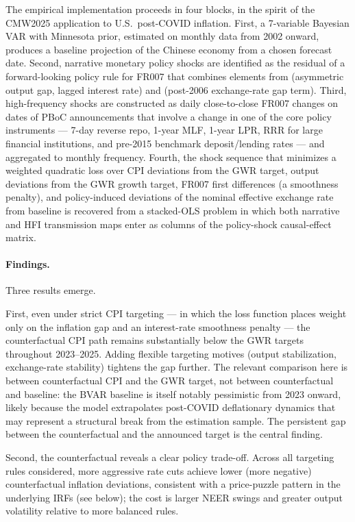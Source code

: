 \documentclass[12pt, a4paper]{article}
\begin{document}
The empirical implementation proceeds in four blocks, in the spirit of the CMW2025 application to U.S.\ post-COVID inflation. First, a 7-variable Bayesian VAR with Minnesota prior, estimated on monthly data from 2002 onward, produces a baseline projection of the Chinese economy from a chosen forecast date. Second, narrative monetary policy shocks are identified as the residual of a forward-looking policy rule for FR007 that combines elements from \citet{chen2025} (asymmetric output gap, lagged interest rate) and \citet{rey2026} (post-2006 exchange-rate gap term). Third, high-frequency shocks are constructed as daily close-to-close FR007 changes on dates of PBoC announcements that involve a change in one of the core policy instruments --- 7-day reverse repo, 1-year MLF, 1-year LPR, RRR for large financial institutions, and pre-2015 benchmark deposit/lending rates --- and aggregated to monthly frequency. Fourth, the shock sequence that minimizes a weighted quadratic loss over CPI deviations from the GWR target, output deviations from the GWR growth target, FR007 first differences (a smoothness penalty), and policy-induced deviations of the nominal effective exchange rate from baseline is recovered from a stacked-OLS problem in which both narrative and HFI transmission maps enter as columns of the policy-shock causal-effect matrix.

\paragraph{Findings.} Three results emerge.

First, even under strict CPI targeting --- in which the loss function places weight only on the inflation gap and an interest-rate smoothness penalty --- the counterfactual CPI path remains substantially below the GWR targets throughout 2023--2025. Adding flexible targeting motives (output stabilization, exchange-rate stability) tightens the gap further. The relevant comparison here is between counterfactual CPI and the GWR target, not between counterfactual and baseline: the BVAR baseline is itself notably pessimistic from 2023 onward, likely because the model extrapolates post-COVID deflationary dynamics that may represent a structural break from the estimation sample. The persistent gap between the counterfactual and the announced target is the central finding.

Second, the counterfactual reveals a clear policy trade-off. Across all targeting rules considered, more aggressive rate cuts achieve lower (more negative) counterfactual inflation deviations, consistent with a price-puzzle pattern in the underlying IRFs (see below); the cost is larger NEER swings and greater output volatility relative to more balanced rules.
\end{document}
